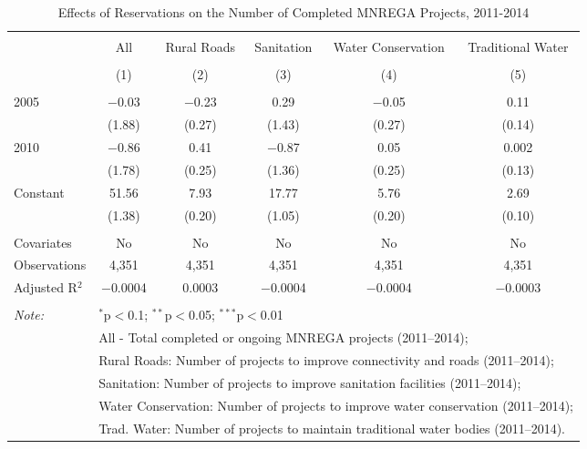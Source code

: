 
\begin{table}[!htbp] \centering 
  \caption{Effects of Reservations on the Number of Completed MNREGA Projects, 2011-2014} 
  \label{main_mnrega} 
\begin{tabular}{@{\extracolsep{5pt}}lccccc} 
\\[-1.8ex]\hline 
\hline \\[-1.8ex] 
 & All & Rural Roads & Sanitation & Water Conservation & Traditional Water \\ 
\\[-1.8ex] & (1) & (2) & (3) & (4) & (5)\\ 
\hline \\[-1.8ex] 
 2005 & $-$0.03 & $-$0.23 & 0.29 & $-$0.05 & 0.11 \\ 
  & (1.88) & (0.27) & (1.43) & (0.27) & (0.14) \\ 
  2010 & $-$0.86 & 0.41 & $-$0.87 & 0.05 & 0.002 \\ 
  & (1.78) & (0.25) & (1.36) & (0.25) & (0.13) \\ 
  Constant & 51.56 & 7.93 & 17.77 & 5.76 & 2.69 \\ 
  & (1.38) & (0.20) & (1.05) & (0.20) & (0.10) \\ 
 \hline \\[-1.8ex] 
Covariates & No & No & No & No & No \\ 
Observations & 4,351 & 4,351 & 4,351 & 4,351 & 4,351 \\ 
Adjusted R$^{2}$ & $-$0.0004 & 0.0003 & $-$0.0004 & $-$0.0004 & $-$0.0003 \\ 
\hline 
\hline \\[-1.8ex] 
\textit{Note:}  & \multicolumn{5}{l}{$^{*}$p$<$0.1; $^{**}$p$<$0.05; $^{***}$p$<$0.01} \\ 
 & \multicolumn{5}{l}{All - Total completed or ongoing MNREGA projects (2011--2014);} \\ 
 & \multicolumn{5}{l}{Rural Roads: Number of projects to improve connectivity and roads (2011--2014);} \\ 
 & \multicolumn{5}{l}{Sanitation:  Number of projects to improve sanitation facilities  (2011--2014);} \\ 
 & \multicolumn{5}{l}{Water Conservation: Number of projects to improve water conservation (2011--2014);} \\ 
 & \multicolumn{5}{l}{Trad. Water: Number of projects to maintain traditional water bodies (2011--2014).} \\ 
\end{tabular} 
\end{table} 

